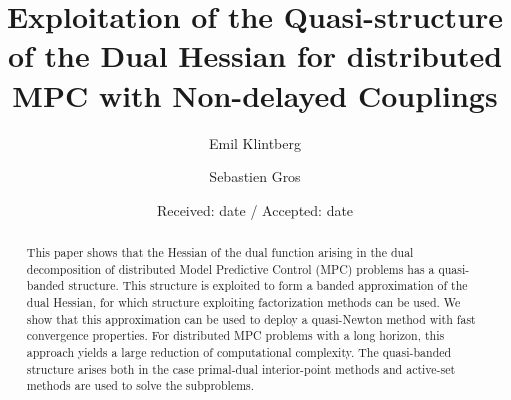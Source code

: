 \title{Exploitation of the Quasi-structure of the Dual Hessian for distributed MPC with Non-delayed Couplings%
}


\author{Emil Klintberg         \and
        Sebastien Gros %
}



\date{Received: date / Accepted: date}


\maketitle

\begin{abstract}
This paper shows that the Hessian of the dual function arising in the dual decomposition of distributed Model Predictive Control (MPC) problems has a quasi-banded structure. This structure is exploited to form a banded approximation of the dual Hessian, for which structure exploiting factorization methods can be used. We show that this approximation can be used to deploy a quasi-Newton method with fast convergence properties. For distributed MPC problems with a long horizon, this approach yields a large reduction of computational complexity. The quasi-banded structure arises both in the case primal-dual interior-point methods and active-set methods are used to solve the subproblems.
\end{abstract}

